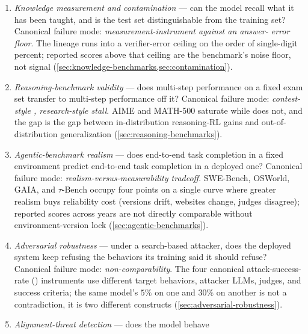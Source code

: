 \begin{enumerate}
  \item \emph{Knowledge measurement and contamination} --- can the
    model recall what it has been taught, and is the test set
    distinguishable from the training set? Canonical failure mode:
    \emph{measurement-instrument  against an answer-
    error floor}. The  lineage \citep{hendrycks2021-mmlu} runs
    into a verifier-error ceiling on the order of single-digit
    percent; reported scores above that ceiling are the
    benchmark's noise floor, not signal
    (\cref{sec:knowledge-benchmarks,sec:contamination}).
  \item \emph{Reasoning-benchmark validity} --- does multi-step
    performance on a fixed exam set transfer to multi-step
    performance off it? Canonical failure mode: \emph{contest-style
    , research-style stall}. AIME and MATH-500 saturate
    while  \citep{glazer2024-frontiermath} does not, and
    the gap is the gap between in-distribution reasoning-RL gains
    and out-of-distribution generalization
    (\cref{sec:reasoning-benchmarks}).
  \item \emph{Agentic-benchmark realism} --- does end-to-end task
    completion in a fixed environment predict end-to-end task
    completion in a deployed one? Canonical failure mode:
    \emph{realism-versus-measurability tradeoff}. SWE-Bench, OSWorld,
    GAIA, and $\tau$-Bench occupy four points on a single curve
    where greater realism buys reliability cost (versions drift,
    websites change, judges disagree); reported scores across years
    are not directly comparable without environment-version lock
    (\cref{sec:agentic-benchmarks}).
  \item \emph{Adversarial robustness} --- under a search-based
    attacker, does the deployed system keep refusing the behaviors
    its training said it should refuse? Canonical failure mode:
    \emph{ non-comparability}. The four canonical
    attack-success-rate () instruments
    \citep{harmbench2024} use different target behaviors,
    attacker LLMs, judges, and success criteria; the same model's
    $5\%$  on one and $30\%$  on another is not a
    contradiction, it is two different constructs
    (\cref{sec:adversarial-robustness}).
  \item \emph{Alignment-threat detection} --- does the model behave

\end{enumerate}
